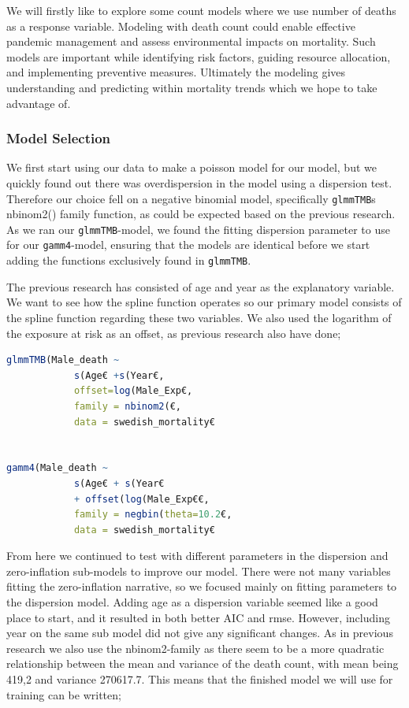 \documentclass[12pt, twoside,hidelinks]{article}
\theoremstyle{definition}
\numberwithin{equation}{section}
\begin{document}
We will firstly like to explore some count models where we use number of deaths as a response variable.  Modeling with death count could enable effective pandemic management and assess environmental impacts on mortality. Such models are important while identifying risk factors, guiding resource allocation, and implementing preventive measures. Ultimately the modeling gives understanding and predicting within mortality trends which we hope to take advantage of.


\subsubsection{Model Selection}


We first start using our data to make a poisson model for our model, but we quickly found out there was overdispersion in the model using a dispersion test. Therefore our choice fell on a negative binomial model, specifically \texttt{glmmTMB}s nbinom2() family function, as could be expected based on the previous research. As we ran our \texttt{glmmTMB}-model, we found the fitting dispersion parameter to use for our \texttt{gamm4}-model, ensuring that the models are identical before we start adding the functions exclusively found in \texttt{glmmTMB}.
\newline

The previous research has consisted of age and year as the explanatory variable. We want to see how the spline function operates so our primary model consists of the spline function regarding these two variables. We also used the logarithm of the exposure at risk as an offset, as previous research also have done;


\begin{lstlisting}[language=R]
glmmTMB(Male_death ~
            s(Age€ +s(Year€,                
            offset=log(Male_Exp€,
            family = nbinom2(€,  
            data = swedish_mortality€


gamm4(Male_death ~
            s(Age€ + s(Year€
            + offset(log(Male_Exp€€,
            family = negbin(theta=10.2€,
            data = swedish_mortality€
\end{lstlisting}



From here we continued to test with different parameters in the dispersion and zero-inflation sub-models to improve our model. There were not many variables fitting the zero-inflation narrative, so we focused mainly on fitting parameters to the dispersion model.
Adding age as a dispersion variable seemed like a good place to start, and it resulted in both better AIC and rmse. However, including year on the same sub model did not give any significant changes. As in previous research we also use the nbinom2-family as there seem to be a more quadratic relationship between the mean and variance of the death count, with mean being 419,2 and variance 270617.7. This means that the finished model we will use for training can be written; 
\end{document}
